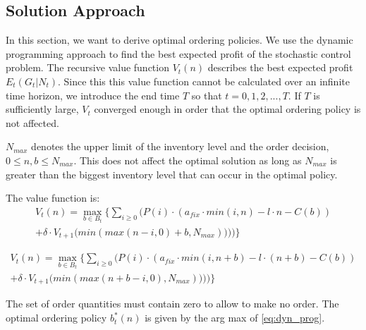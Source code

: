 \subsection{Solution Approach}
In this section, we want to derive optimal ordering policies.
We use the dynamic programming approach to find the best expected profit of the stochastic control problem.
The recursive value function $V_t(n)$ describes the best expected profit $E_t(G_t | N_t)$.
Since this this value function cannot be calculated over an infinite time horizon, we introduce the end time $T$ so that $t = 0, 1, 2, ..., T$.
If $T$ is sufficiently large, $V_t$ converged enough in order that the optimal ordering policy is not affected.

$N_{max}$ denotes the upper limit of the inventory level and the order decision, $0 \leq n, b \leq N_{max}$. This does not affect the optimal solution as long as $N_{max}$ is greater than the biggest inventory level that can occur in the optimal policy.

The value function is:
\begin{equation}
\begin{split}
V_t(n) = \max_{b \in B_t} \Bigg\{
	\sum_{i \geq 0} \Big(
		P(i) \cdot (
			a_{fix} \cdot min(i, n) %
			- l \cdot n %
			- C(b) %
		) \\
		+ \delta \cdot V_{t+1}\big(min(max(n - i, 0) + b, N_{max}))\big)
	\Big)\Bigg\}
\end{split}
\label{eq:dyn_prog}
\end{equation}


\begin{equation}
\begin{split}
V_t(n) = \max_{b \in B_t} \Bigg\{
\sum_{i \geq 0} \Big(
P(i) \cdot (
a_{fix} \cdot min(i, n + b) %
- l \cdot (n + b) %
- C(b) %
) \\
+ \delta \cdot V_{t+1}\big(min(max(n + b - i, 0), N_{max}))\big)
\Big)\Bigg\}
\end{split}
\label{eq:dyn_prog2}
\end{equation}

The set of order quantities must contain zero to allow to make no order.
The optimal ordering policy $b_t^*(n)$ is given by the arg max of \cref{eq:dyn_prog}. 


